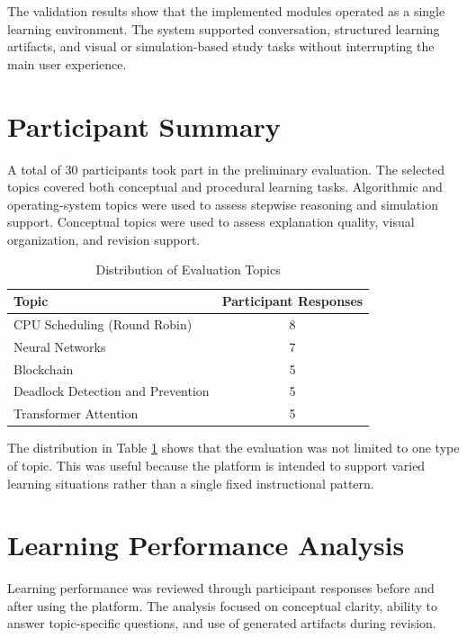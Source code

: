 The validation results show that the implemented modules operated as a single learning environment. The system supported conversation, structured learning artifacts, and visual or simulation-based study tasks without interrupting the main user experience.

\section[Participant Summary]{\textbf{Participant Summary}}
A total of 30 participants took part in the preliminary evaluation. The selected topics covered both conceptual and procedural learning tasks. Algorithmic and operating-system topics were used to assess stepwise reasoning and simulation support. Conceptual topics were used to assess explanation quality, visual organization, and revision support.

\begin{table}[H]
\centering
\caption{Distribution of Evaluation Topics}
\begin{tabular}{p{7cm}c}
\toprule
\textbf{Topic} & \textbf{Participant Responses}\\
\midrule
CPU Scheduling (Round Robin) & 8\\
Neural Networks & 7\\
Blockchain & 5\\
Deadlock Detection and Prevention & 5\\
Transformer Attention & 5\\
\bottomrule
\end{tabular}
\label{tab:topic-distribution}
\end{table}

The distribution in Table \ref{tab:topic-distribution} shows that the evaluation was not limited to one type of topic. This was useful because the platform is intended to support varied learning situations rather than a single fixed instructional pattern.

\section[Learning Performance Analysis]{\textbf{Learning Performance Analysis}}
Learning performance was reviewed through participant responses before and after using the platform. The analysis focused on conceptual clarity, ability to answer topic-specific questions, and use of generated artifacts during revision.

